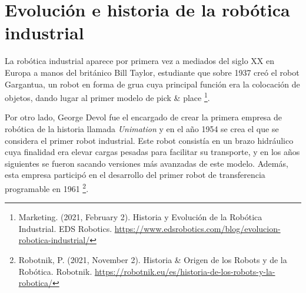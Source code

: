 \section{Evolución e historia de la robótica industrial}
\label{sec:terceraseccion}

La robótica industrial aparece por primera vez a mediados del siglo XX en Europa a manos del británico Bill Taylor, estudiante que sobre 1937 creó el robot Gargantua, un robot en forma de grua cuya principal función era la colocación de objetos, dando lugar al primer modelo de pick \& place \footnote{Marketing. (2021, February 2). Historia y Evolución de la Robótica Industrial. EDS Robotics. \url{https://www.edsrobotics.com/blog/evolucion-robotica-industrial/}}. 

Por otro lado, George Devol fue el encargado de crear la primera empresa de robótica de la historia llamada \textit{Unimation} y en el año 1954 se crea el que se considera el primer robot industrial. Este robot consistía en un brazo hidráulico cuya finalidad era elevar cargas pesadas para facilitar su transporte, y en los años siguientes se fueron sacando versiones más avanzadas de este modelo. Además, esta empresa participó en el desarrollo del primer robot de transferencia programable en 1961 \footnote{Robotnik, P. (2021, November 2). Historia \& Origen de los Robots y de la Robótica. Robotnik. \url{https://robotnik.eu/es/historia-de-los-robots-y-la-robotica/}}. \\



